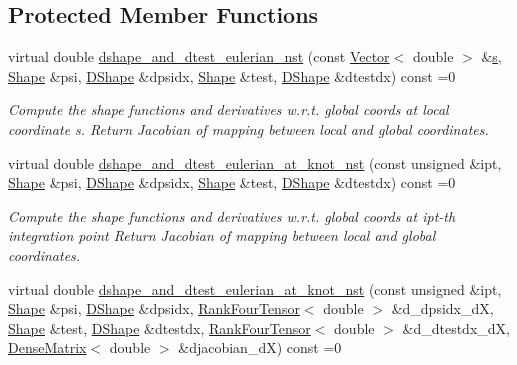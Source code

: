 \subsection*{Protected Member Functions}
\begin{DoxyCompactItemize}
\item 
virtual double \hyperlink{classoomph_1_1GeneralisedNewtonianNavierStokesEquations_a2607956e6619a4d3ef900bf65dd1ee8f}{dshape\+\_\+and\+\_\+dtest\+\_\+eulerian\+\_\+nst} (const \hyperlink{classoomph_1_1Vector}{Vector}$<$ double $>$ \&\hyperlink{cfortran_8h_ab7123126e4885ef647dd9c6e3807a21c}{s}, \hyperlink{classoomph_1_1Shape}{Shape} \&psi, \hyperlink{classoomph_1_1DShape}{D\+Shape} \&dpsidx, \hyperlink{classoomph_1_1Shape}{Shape} \&test, \hyperlink{classoomph_1_1DShape}{D\+Shape} \&dtestdx) const =0
\begin{DoxyCompactList}\small\item\em Compute the shape functions and derivatives w.\+r.\+t. global coords at local coordinate s. Return Jacobian of mapping between local and global coordinates. \end{DoxyCompactList}\item 
virtual double \hyperlink{classoomph_1_1GeneralisedNewtonianNavierStokesEquations_a20efdbf511d69c1176c6b3df4dfc5fb3}{dshape\+\_\+and\+\_\+dtest\+\_\+eulerian\+\_\+at\+\_\+knot\+\_\+nst} (const unsigned \&ipt, \hyperlink{classoomph_1_1Shape}{Shape} \&psi, \hyperlink{classoomph_1_1DShape}{D\+Shape} \&dpsidx, \hyperlink{classoomph_1_1Shape}{Shape} \&test, \hyperlink{classoomph_1_1DShape}{D\+Shape} \&dtestdx) const =0
\begin{DoxyCompactList}\small\item\em Compute the shape functions and derivatives w.\+r.\+t. global coords at ipt-\/th integration point Return Jacobian of mapping between local and global coordinates. \end{DoxyCompactList}\item 
virtual double \hyperlink{classoomph_1_1GeneralisedNewtonianNavierStokesEquations_a24a93b73dba66e04eabb9b37a9360daa}{dshape\+\_\+and\+\_\+dtest\+\_\+eulerian\+\_\+at\+\_\+knot\+\_\+nst} (const unsigned \&ipt, \hyperlink{classoomph_1_1Shape}{Shape} \&psi, \hyperlink{classoomph_1_1DShape}{D\+Shape} \&dpsidx, \hyperlink{classoomph_1_1RankFourTensor}{Rank\+Four\+Tensor}$<$ double $>$ \&d\+\_\+dpsidx\+\_\+dX, \hyperlink{classoomph_1_1Shape}{Shape} \&test, \hyperlink{classoomph_1_1DShape}{D\+Shape} \&dtestdx, \hyperlink{classoomph_1_1RankFourTensor}{Rank\+Four\+Tensor}$<$ double $>$ \&d\+\_\+dtestdx\+\_\+dX, \hyperlink{classoomph_1_1DenseMatrix}{Dense\+Matrix}$<$ double $>$ \&djacobian\+\_\+dX) const =0

\end{DoxyCompactItemize}
